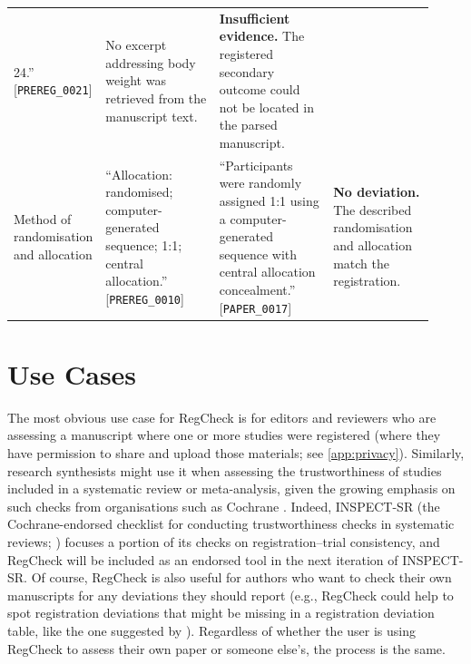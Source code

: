 \documentclass{article}
\begin{document}
\begin{table}[h]
\begin{tabular}{@{}p{0.14\linewidth}p{0.27\linewidth}p{0.27\linewidth}p{0.24\linewidth}@{}}
    24.'' [\texttt{PREREG\_0021}] &
    No excerpt addressing body weight was retrieved from the manuscript text. &
    \textbf{Insufficient evidence.} The registered secondary outcome could not
    be located in the parsed manuscript. \\
    \addlinespace[3pt]
    Method of randomisation and allocation &
    ``Allocation: randomised; computer-generated sequence; 1:1; central
    allocation.'' [\texttt{PREREG\_0010}] &
    ``Participants were randomly assigned 1:1 using a computer-generated
    sequence with central allocation concealment.'' [\texttt{PAPER\_0017}] &
    \textbf{No deviation.} The described randomisation and allocation match the
    registration. \\
    \bottomrule
  \end{tabular}
\end{table}

\section{Use Cases}\label{app:use-cases}
The most obvious use case for RegCheck is for editors and reviewers who are
assessing a manuscript where one or more studies were registered (where they
have permission to share and upload those materials; see
\cref{app:privacy}). Similarly, research synthesists might use it when assessing
the trustworthiness of studies included in a systematic review or meta-analysis,
given the growing emphasis on such checks from organisations such as Cochrane
\citep{wilkinson_inspect-sr_2025}. Indeed, INSPECT-SR (the Cochrane-endorsed
checklist for conducting trustworthiness checks in systematic reviews;
\citealp{wilkinson_inspect-sr_2025}) focuses a portion of its checks on
registration--trial consistency, and RegCheck will be included as an endorsed
tool in the next iteration of INSPECT-SR. Of course, RegCheck is also useful for
authors who want to check their own manuscripts for any deviations they should
report (e.g., RegCheck could help to spot registration deviations that might be
missing in a registration deviation table, like the one suggested by
\citealp{willroth_best_2024}). Regardless of whether the user is using RegCheck
to assess their own paper or someone else's, the process is the same.
\end{document}
